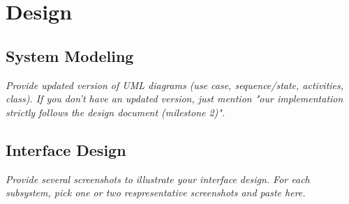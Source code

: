
\section{Design}\label{sec:design}
    \subsection{System Modeling}
        \emph{Provide updated version of UML diagrams (use case, sequence/state, activities, class). If you don't have an updated version, just mention "our implementation strictly follows the design document (milestone 2)".}

    \subsection{Interface Design}
        \emph{Provide several screenshots to illustrate your interface design. For each subsystem, pick one or two respresentative screenshots and paste here.}
